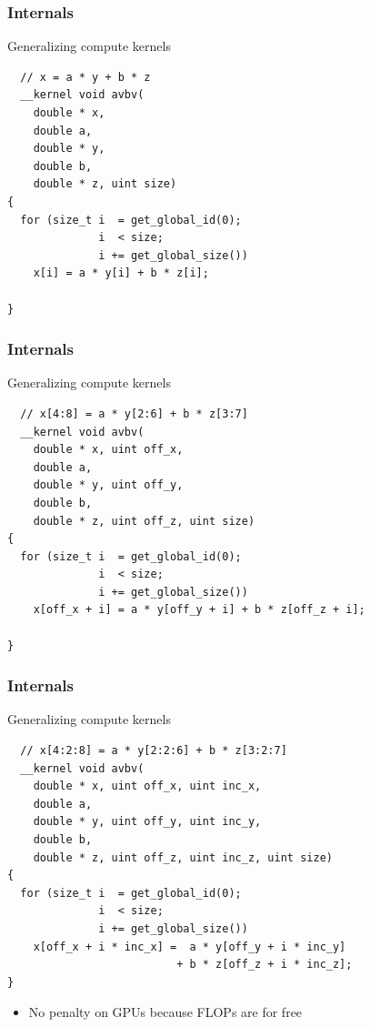 \begin{frame}[fragile]
\frametitle{Internals}

 \begin{block}{Generalizing compute kernels}
  \begin{lstlisting}
  // x = a * y + b * z
  __kernel void avbv(
    double * x,
    double a,
    double * y,
    double b,
    double * z, uint size)
{
  for (size_t i  = get_global_id(0);
              i  < size;
              i += get_global_size())
    x[i] = a * y[i] + b * z[i]; 

}
  \end{lstlisting}
 \end{block}

 \vspace*{1.5cm}
\end{frame}


\begin{frame}[fragile]
\frametitle{Internals}

 \begin{block}{Generalizing compute kernels}
  \begin{lstlisting}
  // x[4:8] = a * y[2:6] + b * z[3:7]
  __kernel void avbv(
    double * x, uint off_x,
    double a,
    double * y, uint off_y,
    double b,
    double * z, uint off_z, uint size)
{
  for (size_t i  = get_global_id(0);
              i  < size;
              i += get_global_size())
    x[off_x + i] = a * y[off_y + i] + b * z[off_z + i]; 

}
  \end{lstlisting}
 \end{block}

 \vspace*{1.5cm}
\end{frame}



\begin{frame}[fragile]
\frametitle{Internals}

 \begin{block}{Generalizing compute kernels}
  \begin{lstlisting}
  // x[4:2:8] = a * y[2:2:6] + b * z[3:2:7]
  __kernel void avbv(
    double * x, uint off_x, uint inc_x,
    double a,
    double * y, uint off_y, uint inc_y,
    double b,
    double * z, uint off_z, uint inc_z, uint size)
{
  for (size_t i  = get_global_id(0);
              i  < size;
              i += get_global_size())
    x[off_x + i * inc_x] =  a * y[off_y + i * inc_y]
                          + b * z[off_z + i * inc_z]; 
}
  \end{lstlisting}
 \end{block}

  \begin{block}{}
   \begin{itemize}
    \item No penalty on GPUs because FLOPs are for free
   \end{itemize}
  \end{block}

\end{frame}


